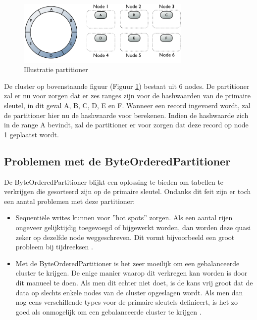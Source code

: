 \begin{figure}[H]
	\centering
	\includegraphics[width=0.75\textwidth]{img/4_architectuur/partitioner}
	\caption{Illustratie partitioner \citep{DataStax2016Partitioner}}
	\label{fig:partitioner}
\end{figure}

De cluster op bovenstaande figuur (Figuur \ref{fig:partitioner}) bestaat uit 6 nodes.
De partitioner zal er nu voor zorgen dat er zes ranges zijn voor de hashwaarden van de primaire sleutel, in dit geval A, B, C, D, E en F.
Wanneer een record ingevoerd wordt, zal de partitioner hier nu de hashwaarde voor berekenen.
Indien de hashwaarde zich in de range A bevindt, zal de partitioner er voor zorgen dat deze record op node 1 geplaatst wordt.

\subsection{Problemen met de ByteOrderedPartitioner}
De ByteOrderedPartitioner blijkt een oplossing te bieden om tabellen te verkrijgen die gesorteerd zijn op de primaire sleutel.
Ondanks dit feit zijn er toch een aantal problemen met deze partitioner:

\begin{itemize}
	\item Sequentiële writes kunnen voor ''hot spots'' zorgen.
	Als een aantal rijen ongeveer gelijktijdig toegevoegd of bijgewerkt worden, dan worden deze quasi zeker op dezelfde node weggeschreven.
	Dit vormt bijvoorbeeld een groot probleem bij tijdreeksen \citep{kan2014cassandra}.
	
	\item Met de ByteOrderedPartitioner is het zeer moeilijk om een gebalanceerde cluster te krijgen.
	De enige manier waarop dit verkregen kan worden is door dit manueel te doen.
	Als men dit echter niet doet, is de kans vrij groot dat de data op slechts enkele nodes van de cluster opgeslagen wordt.
	Als men dan nog eens verschillende types voor de primaire sleutels definieert, is het zo goed als onmogelijk om een gebalanceerde cluster te krijgen
	\citep{Bauer2013CaseAgainstByteOrder}.
\end{itemize}

